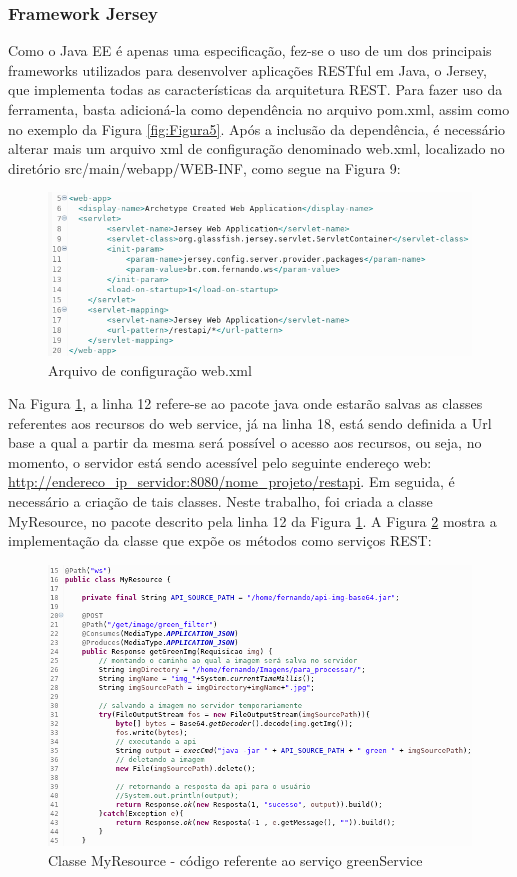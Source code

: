 \documentclass[12pt]{article}
\begin{document}
\subsubsection{Framework Jersey}

Como o Java EE é apenas uma especificação, fez-se o uso de um dos principais frameworks utilizados para desenvolver aplicações RESTful em Java, o Jersey, que implementa todas as características da arquitetura REST. Para fazer uso da ferramenta, basta adicioná-la como dependência no arquivo pom.xml, assim como no exemplo da Figura \ref{fig:Figura5}. Após a inclusão da dependência, é necessário alterar mais um arquivo xml de configuração denominado web.xml, localizado no diretório src/main/webapp/WEB-INF, como segue na Figura 9:

\begin{figure}[ht]
	\centering
	\includegraphics[width=.9\textwidth]{web-xml.png}
	\caption{Arquivo de configuração web.xml}
	\label{fig:Figura9}
\end{figure}

Na Figura \ref{fig:Figura9}, a linha 12 refere-se ao pacote java onde estarão salvas as classes referentes aos recursos do web service, já na linha 18, está sendo definida a Url base a qual a partir da mesma será possível o acesso aos recursos, ou seja, no momento, o servidor está sendo acessível pelo seguinte endereço web: \url{http://endereco_ip_servidor:8080/nome_projeto/restapi}.
Em seguida, é necessário a criação de tais classes. Neste trabalho, foi criada a classe MyResource, no pacote descrito pela linha 12 da Figura \ref{fig:Figura9}. A Figura \ref{fig:Figura10} mostra a implementação da classe que expõe os métodos como serviços REST:

\begin{figure}[ht]
	\centering
	\includegraphics[width=.9\textwidth]{codigo-green-service.png}
	\caption{Classe MyResource - código referente ao serviço greenService}
	\label{fig:Figura10}
\end{figure}
\end{document}
